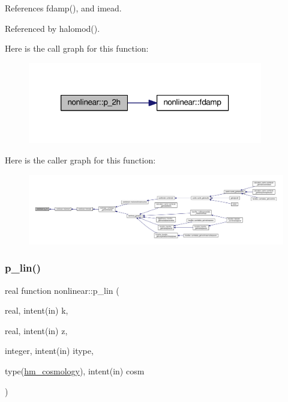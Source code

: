 References fdamp(), and imead.



Referenced by halomod().

Here is the call graph for this function\+:
\nopagebreak
\begin{figure}[H]
\begin{center}
\leavevmode
\includegraphics[width=290pt]{namespacenonlinear_adbb028d781be22805e7c1468b4e795a8_cgraph}
\end{center}
\end{figure}
Here is the caller graph for this function\+:
\nopagebreak
\begin{figure}[H]
\begin{center}
\leavevmode
\includegraphics[width=350pt]{namespacenonlinear_adbb028d781be22805e7c1468b4e795a8_icgraph}
\end{center}
\end{figure}
\mbox{\label{namespacenonlinear_ad2f542da0cba1686588e83dec8ac7617}} 
\subsubsection{\texorpdfstring{p\+\_\+lin()}{p\_lin()}}
{\footnotesize\ttfamily real function nonlinear\+::p\+\_\+lin (\begin{DoxyParamCaption}\item[{real, intent(in)}]{k,  }\item[{real, intent(in)}]{z,  }\item[{integer, intent(in)}]{itype,  }\item[{type(\mbox{\hyperlink{structnonlinear_1_1hm__cosmology}{hm\+\_\+cosmology}}), intent(in)}]{cosm }\end{DoxyParamCaption})\hspace{0.3cm}{\ttfamily [private]}}



